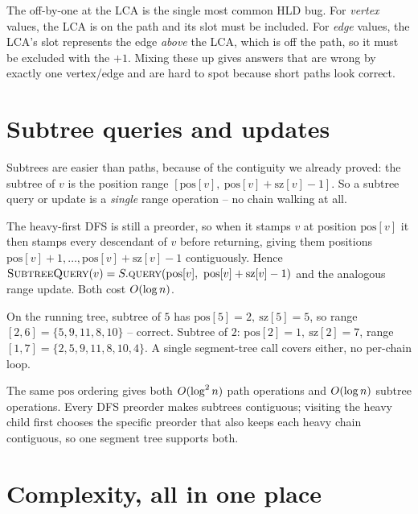 \begin{trapbox}
The off-by-one at the LCA is the single most common HLD bug. For \emph{vertex} values, the LCA is on
the path and its slot must be included. For \emph{edge} values, the LCA's slot represents the edge
\emph{above} the LCA, which is off the path, so it must be excluded with the $+1$. Mixing these up
gives answers that are wrong by exactly one vertex/edge and are hard to spot because short paths
look correct.
\end{trapbox}

\section{Subtree queries and updates}
\label{ch19:subtree}

Subtrees are easier than paths, because of the contiguity we already proved: the subtree of $v$ is the
position range $[\mathrm{pos}[v],\ \mathrm{pos}[v]+\mathrm{sz}[v]-1]$. So a subtree query or update is a
\emph{single} range operation -- no chain walking at all.

\begin{whybox}
The heavy-first DFS is still a preorder, so when it stamps $v$ at position $\mathrm{pos}[v]$ it then
stamps every descendant of $v$ before returning, giving them positions
$\mathrm{pos}[v]+1,\dots,\mathrm{pos}[v]+\mathrm{sz}[v]-1$ contiguously. Hence
$\textsc{SubtreeQuery}(v)=S.\textsc{query}(\mathrm{pos}[v],\ \mathrm{pos}[v]+\mathrm{sz}[v]-1)$ and the
analogous range update. Both cost $O(\log n)$.
\end{whybox}

\begin{labbox}
On the running tree, subtree of $5$ has $\mathrm{pos}[5]=2,\ \mathrm{sz}[5]=5$, so range
$[2,6]=\{5,9,11,8,10\}$ -- correct. Subtree of $2$: $\mathrm{pos}[2]=1,\ \mathrm{sz}[2]=7$, range
$[1,7]=\{2,5,9,11,8,10,4\}$. A single segment-tree call covers either, no per-chain loop.
\end{labbox}

\begin{aestheticbox}
The same $\mathrm{pos}$ ordering gives both $O(\log^2 n)$ path operations and $O(\log n)$ subtree
operations. Every DFS preorder makes subtrees contiguous; visiting the heavy child first chooses the
specific preorder that also keeps each heavy chain contiguous, so one segment tree supports both.
\end{aestheticbox}

\section{Complexity, all in one place}
\label{ch19:complexity}

